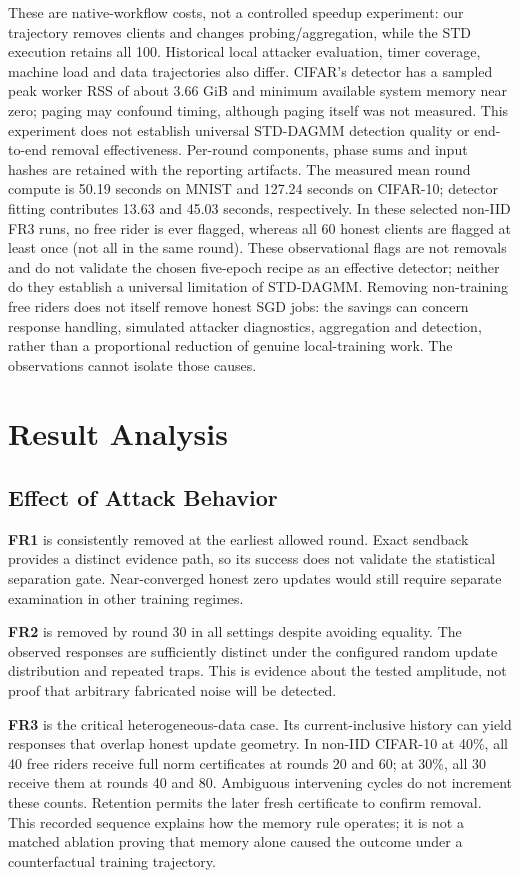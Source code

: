 \documentclass[conference]{IEEEtran}
\begin{document}
These are native-workflow costs, not a controlled speedup experiment: our
trajectory removes clients and changes probing/aggregation, while the STD
execution retains all 100. Historical local attacker evaluation, timer coverage,
machine load and data trajectories also differ. CIFAR's detector has a sampled
peak worker RSS of about 3.66 GiB and minimum available system memory near zero;
paging may confound timing, although paging itself was not measured. This experiment
does not establish universal STD-DAGMM detection quality or end-to-end removal
effectiveness. Per-round components, phase sums and input hashes are retained
with the reporting artifacts.
The measured mean round compute is 50.19 seconds on MNIST and 127.24 seconds
on CIFAR-10; detector fitting contributes 13.63 and 45.03 seconds, respectively.
In these selected non-IID FR3 runs, no free rider is ever flagged, whereas all
60 honest clients are flagged at least once (not all in the same round).
These observational flags are not removals and do not validate the chosen
five-epoch recipe as an effective detector; neither do they establish a
universal limitation of STD-DAGMM.
Removing non-training free riders does not itself remove honest SGD jobs:
the savings can concern response handling, simulated attacker diagnostics,
aggregation and detection, rather than a proportional reduction of genuine
local-training work. The observations cannot isolate those causes.


\FloatBarrier
\section{Result Analysis}
\subsection{Effect of Attack Behavior}
\textbf{FR1} is consistently removed at the earliest allowed round. Exact
sendback provides a distinct evidence path, so its success does not validate
the statistical separation gate. Near-converged honest zero updates would
still require separate examination in other training regimes.

\textbf{FR2} is removed by round 30 in all settings despite avoiding equality.
The observed responses are sufficiently distinct under the configured random
update distribution and repeated traps. This is evidence about the tested
amplitude, not proof that arbitrary fabricated noise will be detected.

\textbf{FR3} is the critical heterogeneous-data case. Its current-inclusive
history can yield responses that overlap honest update geometry. In non-IID
CIFAR-10 at 40\%, all 40 free riders receive full norm certificates at rounds
20 and 60; at 30\%, all 30 receive them at rounds 40 and 80. Ambiguous intervening
cycles do not increment these counts. Retention permits the later fresh
certificate to confirm removal. This recorded sequence explains how the memory
rule operates; it is not a matched ablation proving that memory alone caused
the outcome under a counterfactual training trajectory.
\end{document}
